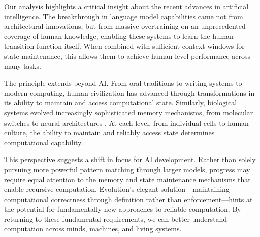 \documentclass[12pt]{article}
\begin{document}
Our analysis highlights a critical insight about the recent advances in artificial intelligence.
The breakthrough in language model capabilities came not from architectural innovations, but from massive overtraining on an unprecedented coverage of human knowledge, enabling these systems to learn the human transition function itself.
When combined with sufficient context windows for state maintenance, this allows them to achieve human-level performance across many tasks.

The principle extends beyond AI.
From oral traditions to writing systems to modern computing, human civilization has advanced through transformations in its ability to maintain and access computational state.
Similarly, biological systems evolved increasingly sophisticated memory mechanisms, from molecular switches to neural architectures \cite{burrill2010making}.
At each level, from individual cells to human culture, the ability to maintain and reliably access state determines computational capability.

This perspective suggests a shift in focus for AI development.
Rather than solely pursuing more powerful pattern matching through larger models, progress may require equal attention to the memory and state maintenance mechanisms that enable recursive computation.
Evolution's elegant solution---maintaining computational correctness through definition rather than enforcement---hints at the potential for fundamentally new approaches to reliable computation.
By returning to these fundamental requirements, we can better understand computation across minds, machines, and living systems.

\begingroup
\footnotesize


\endgroup
\end{document}
